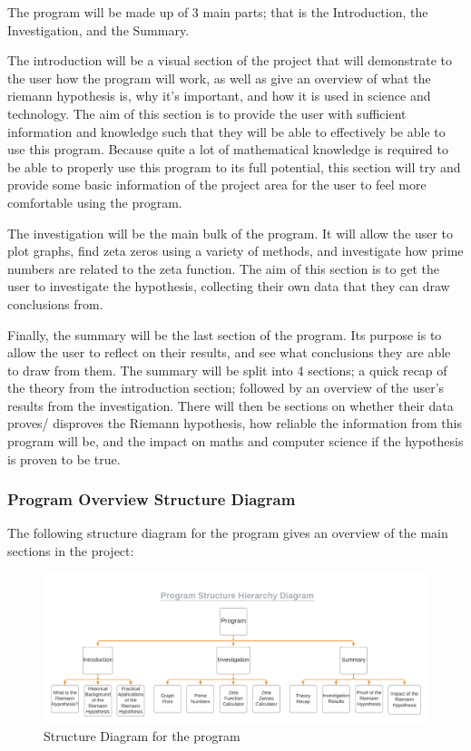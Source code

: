 \documentclass{article}
\begin{document}
The program will be made up of 3 main parts; that is the Introduction, the Investigation, and the Summary.

The introduction will be a visual section of the project that will demonstrate to the user how the program will work, as well as give an overview of what the riemann hypothesis is, why it's important, and how it is used in science and technology. The aim of this section is to provide the user with sufficient information and knowledge such that they will be able to effectively be able to use this program. Because quite a lot of mathematical knowledge is required to be able to properly use this program to its full potential, this section will try and provide some basic information of the project area for the user to feel more comfortable using the program.

The investigation will be the main bulk of the program. It will allow the user to plot graphs, find zeta zeros using a variety of methods, and investigate how prime numbers are related to the zeta function. The aim of this section is to get the user to investigate the hypothesis, collecting their own data that they can draw conclusions from.

Finally, the summary will be the last section of the program. Its purpose is to allow the user to reflect on their results, and see what conclusions they are able to draw from them. The summary will be split into 4 sections; a quick recap of the theory from the introduction section; followed by an overview of the user’s results from the investigation. There will then be sections on whether their data proves/ disproves the Riemann hypothesis, how reliable the information from this program will be, and the impact on maths and computer science if the hypothesis is proven to be true.
\clearpage
\subsubsection{Program Overview Structure Diagram}
The following structure diagram for the program gives an overview of the main sections in the project:

\begin{figure}[h]
    \centering
    \captionsetup{justification=centering}
    \includegraphics[scale=0.385]{program-structure-hierarchy-diagram}
    \caption{Structure Diagram for the program}
\end{figure}
\end{document}
